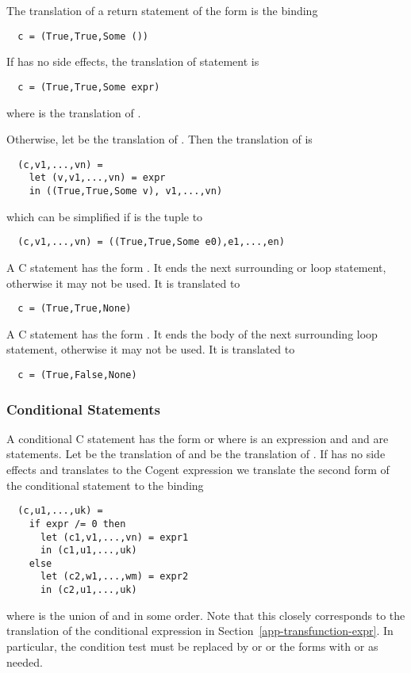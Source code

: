 The translation of a return statement of the form  is the binding
\begin{verbatim}
  c = (True,True,Some ())
\end{verbatim}
If  has no
side effects, the translation of statement  is
\begin{verbatim}
  c = (True,True,Some expr)
\end{verbatim}
where  is
the translation of . 

Otherwise, let  be the translation of . Then 
the translation of  is
\begin{verbatim}
  (c,v1,...,vn) = 
    let (v,v1,...,vn) = expr
    in ((True,True,Some v), v1,...,vn)
\end{verbatim}
which can be simplified if  is the tuple  to
\begin{verbatim}
  (c,v1,...,vn) = ((True,True,Some e0),e1,...,en)
\end{verbatim}

A C  statement has the form . It ends the next surrounding  or loop statement,
otherwise it may not be used. It is translated to
\begin{verbatim}
  c = (True,True,None)
\end{verbatim}

A C  statement has the form . It ends the body of the next surrounding loop statement,
otherwise it may not be used. It is translated to
\begin{verbatim}
  c = (True,False,None)
\end{verbatim}

\subsubsection{Conditional Statements}

A conditional C statement has the form  or  where  is an expression
and  and  are statements. Let  be the translation 
of  and  be the translation of .
If  has no side effects and translates to the Cogent expression  we translate
the second form of the conditional statement to the binding
\begin{verbatim}
  (c,u1,...,uk) =
    if expr /= 0 then 
      let (c1,v1,...,vn) = expr1
      in (c1,u1,...,uk)
    else
      let (c2,w1,...,wm) = expr2
      in (c2,u1,...,uk)
\end{verbatim}
where  is the union of  and  in some order. 
Note that this closely corresponds to the translation 
of the conditional expression in Section~\ref{app-transfunction-expr}. In particular, the condition test 
 must be replaced by  or  or 
the forms with  or  as needed.


